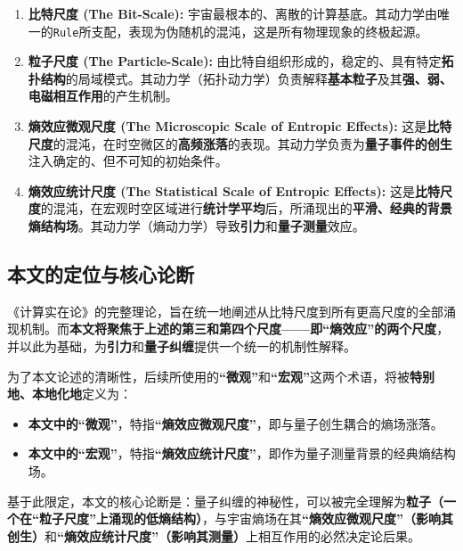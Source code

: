 \documentclass[12pt]{article}
\begin{document}
\begin{enumerate}
    \item   \textbf{比特尺度 (The Bit-Scale):} 宇宙最根本的、离散的计算基底。其动力学由唯一的\texttt{Rule}所支配，表现为伪随机的混沌，这是所有物理现象的终极起源。
    
    \item   \textbf{粒子尺度 (The Particle-Scale):} 由比特自组织形成的，稳定的、具有特定\textbf{拓扑结构}的局域模式。其动力学（拓扑动力学）负责解释\textbf{基本粒子}及其\textbf{强、弱、电磁相互作用}的产生机制。
    
    \item   \textbf{熵效应微观尺度 (The Microscopic Scale of Entropic Effects):} 这是\textbf{比特尺度}的混沌，在时空微区的\textbf{高频涨落}的表现。其动力学负责为\textbf{量子事件的创生}注入确定的、但不可知的初始条件。
    
    \item   \textbf{熵效应统计尺度 (The Statistical Scale of Entropic Effects):} 这是\textbf{比特尺度}的混沌，在宏观时空区域进行\textbf{统计学平均}后，所涌现出的\textbf{平滑、经典的背景熵结构场}。其动力学（熵动力学）导致\textbf{引力}和\textbf{量子测量}效应。
\end{enumerate}

\subsection{本文的定位与核心论断}

《计算实在论》的完整理论，旨在统一地阐述从比特尺度到所有更高尺度的全部涌现机制。而\textbf{本文将聚焦于上述的第三和第四个尺度——即``熵效应''的两个尺度}，并以此为基础，为\textbf{引力}和\textbf{量子纠缠}提供一个统一的机制性解释。

为了本文论述的清晰性，后续所使用的\textbf{``微观''}和\textbf{``宏观''}这两个术语，将被\textbf{特别地、本地化地}定义为：
\begin{itemize}
    \item   \textbf{本文中的``微观''}，特指\textbf{``熵效应微观尺度''}，即与量子创生耦合的熵场涨落。
    \item   \textbf{本文中的``宏观''}，特指\textbf{``熵效应统计尺度''}，即作为量子测量背景的经典熵结构场。
\end{itemize}

\noindent 基于此限定，本文的核心论断是：量子纠缠的神秘性，可以被完全理解为\textbf{粒子（一个在``粒子尺度''上涌现的低熵结构）}，与宇宙熵场在其\textbf{``熵效应微观尺度''（影响其创生）}和\textbf{``熵效应统计尺度''（影响其测量）}上相互作用的必然决定论后果。
\end{document}

